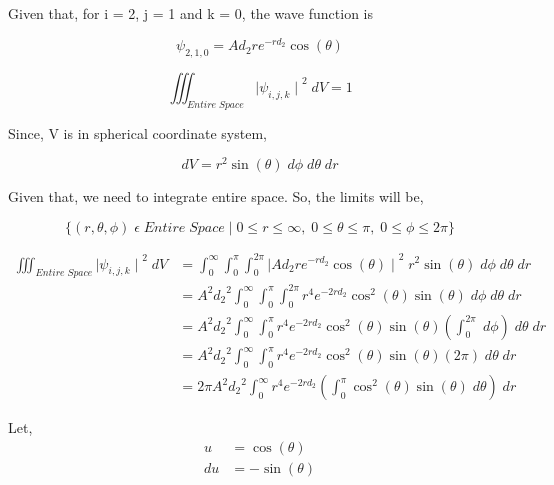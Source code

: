 \documentclass{article}
\begin{document}
\subsection{}%
\large{
Given that, for i = 2, j = 1 and k = 0, the wave function is

\begin{equation*}\tag{4.7}
\psi_{2, 1, 0} = A d_2 r e^{-rd_2} \cos (\theta)
\end{equation*}

\begin{equation*}\tag{31}
\iiint_{Entire \; Space} {\mid \psi_{i, j, k} \mid}^2 \; dV = 1
\end{equation*}

Since, V is in spherical coordinate system,

\begin{equation*}
dV = r^2 \sin (\theta) \; d\phi \; d\theta \; dr
\end{equation*}

Given that, we need to integrate entire space. So, the limits will be,

$$
\{(r, \theta, \phi) \; \epsilon \; Entire\;Space \; | \; 0 \leq r \leq \infty, \; 0 \leq \theta \leq \pi, \; 0 \leq \phi \leq 2\pi\}
$$

\begin{align*}
\iiint_{Entire \; Space} {\mid \psi_{i, j, k} \mid}^2 \; dV & = \int^\infty_0 \int^\pi_0 \int^{2\pi}_0 {\mid A d_2 r e^{-rd_2} \cos (\theta) \mid}^2 \; r^2 \sin (\theta) \; d\phi \; d\theta \; dr \\
															& = A^2 {d_2}^2 \int^\infty_0 \int^\pi_0 \int^{2\pi}_0 r^4 e^{-2 rd_2} \cos^2 (\theta) \sin (\theta) \; d\phi \; d\theta \; dr \\
															& = A^2 {d_2}^2 \int^\infty_0 \int^\pi_0 r^4 e^{-2 rd_2} \cos^2 (\theta) \sin (\theta) \left( \int^{2\pi}_0  \; d\phi \right) \; d\theta \; dr \\
															& = A^2 {d_2}^2 \int^\infty_0 \int^\pi_0 r^4 e^{-2 rd_2} \cos^2 (\theta) \sin (\theta) \left( 2\pi \right) \; d\theta \; dr \\
															& = 2\pi A^2 {d_2}^2 \int^\infty_0 r^4 e^{-2 rd_2} \left( \int^\pi_0 \cos^2 (\theta) \sin (\theta) \; d\theta \right) \; dr
\end{align*}

Let,
\begin{align*}
u															& = \cos (\theta) \\
du															& = -\sin (\theta) \\
\end{align*}

}
\end{document}
